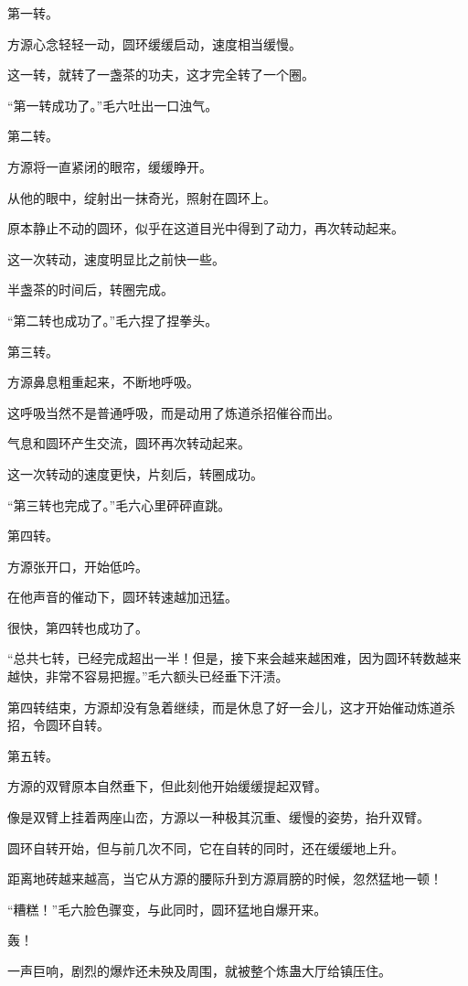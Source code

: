 \begin{this_body}
第一转。

方源心念轻轻一动，圆环缓缓启动，速度相当缓慢。

这一转，就转了一盏茶的功夫，这才完全转了一个圈。

“第一转成功了。”毛六吐出一口浊气。

第二转。

方源将一直紧闭的眼帘，缓缓睁开。

从他的眼中，绽射出一抹奇光，照射在圆环上。

原本静止不动的圆环，似乎在这道目光中得到了动力，再次转动起来。

这一次转动，速度明显比之前快一些。

半盏茶的时间后，转圈完成。

“第二转也成功了。”毛六捏了捏拳头。

第三转。

方源鼻息粗重起来，不断地呼吸。

这呼吸当然不是普通呼吸，而是动用了炼道杀招催谷而出。

气息和圆环产生交流，圆环再次转动起来。

这一次转动的速度更快，片刻后，转圈成功。

“第三转也完成了。”毛六心里砰砰直跳。

第四转。

方源张开口，开始低吟。

在他声音的催动下，圆环转速越加迅猛。

很快，第四转也成功了。

“总共七转，已经完成超出一半！但是，接下来会越来越困难，因为圆环转数越来越快，非常不容易把握。”毛六额头已经垂下汗渍。

第四转结束，方源却没有急着继续，而是休息了好一会儿，这才开始催动炼道杀招，令圆环自转。

第五转。

方源的双臂原本自然垂下，但此刻他开始缓缓提起双臂。

像是双臂上挂着两座山峦，方源以一种极其沉重、缓慢的姿势，抬升双臂。

圆环自转开始，但与前几次不同，它在自转的同时，还在缓缓地上升。

距离地砖越来越高，当它从方源的腰际升到方源肩膀的时候，忽然猛地一顿！

“糟糕！”毛六脸色骤变，与此同时，圆环猛地自爆开来。

轰！

一声巨响，剧烈的爆炸还未殃及周围，就被整个炼蛊大厅给镇压住。


\end{this_body}
